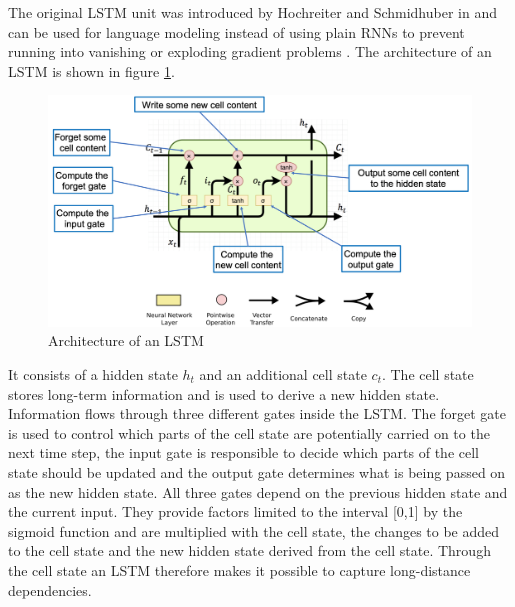 
The original \ac{LSTM} unit was introduced by Hochreiter and Schmidhuber in \cite{Hochreiter1997} and can be used for language modeling instead of using plain \acp{RNN} to prevent running into vanishing or exploding gradient problems \cite{Sundermeyer2012}. The architecture of an \ac{LSTM} is shown in figure \ref{lstm_architecture}.

\begin{figure}[ht]
	\centering
	\includegraphics[width=\linewidth]{figures/lstm_architecture.png}
	\caption{Architecture of an \ac{LSTM} \cite{Gertz2020}}
	\label{lstm_architecture}
\end{figure}

It consists of a hidden state $h_t$ and an additional cell state $c_t$. The cell state stores long-term information and is used to derive a new hidden state. Information flows through three different gates inside the \ac{LSTM}. The forget gate is used to control which parts of the cell state are potentially carried on to the next time step, the input gate is responsible to decide which parts of the cell state should be updated and the output gate determines what is being passed on as the new hidden state. All three gates depend on the previous hidden state and the current input. They provide factors limited to the interval [0,1] by the sigmoid function and are multiplied with the cell state, the changes to be added to the cell state and the new hidden state derived from the cell state. Through the cell state an \ac{LSTM} therefore makes it possible to capture long-distance dependencies. \cite{Gertz2020}

